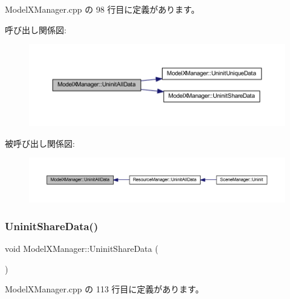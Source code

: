  Model\+X\+Manager.\+cpp の 98 行目に定義があります。

呼び出し関係図\+:
\nopagebreak
\begin{figure}[H]
\begin{center}
\leavevmode
\includegraphics[width=350pt]{class_model_x_manager_a915bf3c57058e235d91db06f3fe5f538_cgraph}
\end{center}
\end{figure}
被呼び出し関係図\+:
\nopagebreak
\begin{figure}[H]
\begin{center}
\leavevmode
\includegraphics[width=350pt]{class_model_x_manager_a915bf3c57058e235d91db06f3fe5f538_icgraph}
\end{center}
\end{figure}
\mbox{\label{class_model_x_manager_a9e3d0dc8addebebc87f450cde6c5e659}} 
\subsubsection{\texorpdfstring{Uninit\+Share\+Data()}{UninitShareData()}}
{\footnotesize\ttfamily void Model\+X\+Manager\+::\+Uninit\+Share\+Data (\begin{DoxyParamCaption}{ }\end{DoxyParamCaption})\hspace{0.3cm}{\ttfamily [static]}}



 Model\+X\+Manager.\+cpp の 113 行目に定義があります。


